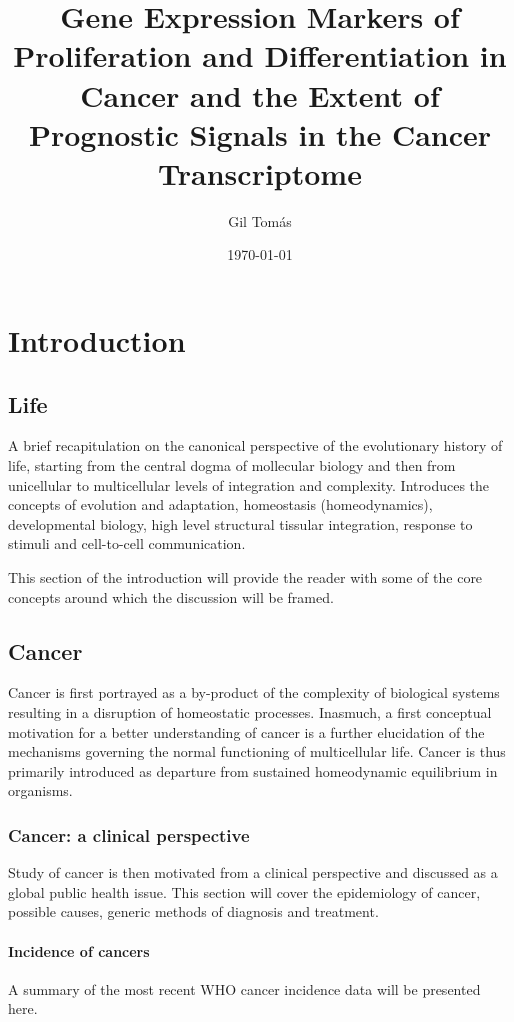 \documentclass[11pt]{article}
\author{Gil Tomás}
\date{\today}
\title{Gene Expression Markers of Proliferation and Differentiation in Cancer and the Extent of Prognostic Signals in the Cancer Transcriptome}
\begin{document}
\maketitle
\tableofcontents


\section{Introduction}
\label{sec-1}
\subsection{Life}
\label{sec-1-1}
A brief recapitulation on the canonical perspective of the evolutionary history
of life, starting from the central dogma of mollecular biology and then from
unicellular to multicellular levels of integration and complexity. Introduces
the concepts of evolution and adaptation, homeostasis (homeodynamics),
developmental biology, high level structural tissular integration, response to
stimuli and cell-to-cell communication.

This section of the introduction will provide the reader with some of the core
concepts around which the discussion will be framed.
\subsection{Cancer}
\label{sec-1-2}
Cancer is first portrayed as a by-product of the complexity of biological
systems resulting in a disruption of homeostatic processes. Inasmuch, a first
conceptual motivation for a better understanding of cancer is a further
elucidation of the mechanisms governing the normal functioning of multicellular
life. Cancer is thus primarily introduced as departure from sustained
homeodynamic equilibrium in organisms.
\subsubsection{Cancer: a clinical perspective}
\label{sec-1-2-1}
Study of cancer is then motivated from a clinical perspective and discussed as a
global public health issue. This section will cover the epidemiology of cancer,
possible causes, generic methods of diagnosis and treatment.
\paragraph{Incidence of cancers}
\label{sec-1-2-1-1}
A summary of the most recent WHO cancer incidence data will be presented here.
\end{document}
